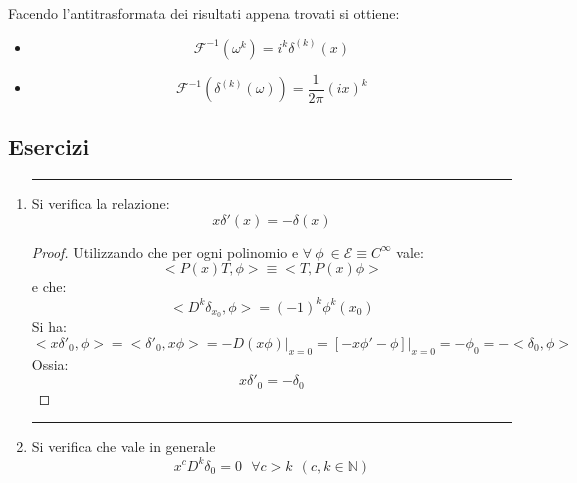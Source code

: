 \documentclass[twoside]{article}
\begin{document}
Facendo l'antitrasformata dei risultati appena trovati si ottiene:
\begin{itemize}
    \item 
    \begin{equation}
        \mathcal{F}^{-1}(\omega^k)=i^k \delta^{(k)}(x)
    \end{equation}
    \item
    \begin{equation}
        \mathcal{F}^{-1}(\delta^{(k)}(\omega))=\frac{1}{2\pi}(ix)^k
    \end{equation}
\end{itemize}

\subsection{Esercizi}
\begin{enumerate}
    \item 
    \rule{\textwidth}{0.7pt}
    Si verifica la relazione:
    \begin{equation}
        x\delta'(x)=-\delta(x)
    \end{equation}    
    \begin{proof}
    Utilizzando che per ogni polinomio e $\forall \ \phi \ \in \mathcal{E}\equiv C^{\infty}$ vale:
    \begin{equation}
        <P(x)T,\phi>\equiv <T,P(x)\phi>
    \end{equation}
    e che:
    \begin{equation}
        <D^k\delta_{x_0},\phi>=(-1)^k \phi^k(x_0)
    \end{equation}
    Si ha:
    \begin{equation}
        <x\delta'_0,\phi>=<\delta'_0,x\phi>=-D(x\phi)\left. \right|_{x=0}=[-x\phi'-\phi]\left. \right|_{x=0}=-\phi_0=-<\delta_0,\phi>
    \end{equation}
    Ossia:
    \begin{equation}
        x\delta'_0=-\delta_0
    \end{equation}
    
    \end{proof}
    
    \item
    \rule{\textwidth}{0.7pt}
    
    Si verifica che vale in generale
    \begin{equation}
        x^cD^k \delta_0=0 \ \ \ \forall c > k \ \ (c,k \in \mathds{N})
    \end{equation}
    

\end{enumerate}
\end{document}
